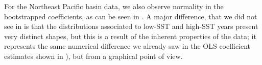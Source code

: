 \bigskip
For the Northeast Pacific basin data, we also observe normality in the bootstrapped coefficients, as can be seen in . A major difference, that we did not see in  is that the distributions associated to low-SST and high-SST years present very distinct shapes, but this is a result of the inherent properties of the data; it represents the same numerical difference we already saw in the OLS coefficient estimates shown in ), but from a graphical point of view.

\begin{figure}[H]
	\centering
	\\
\end{figure}
